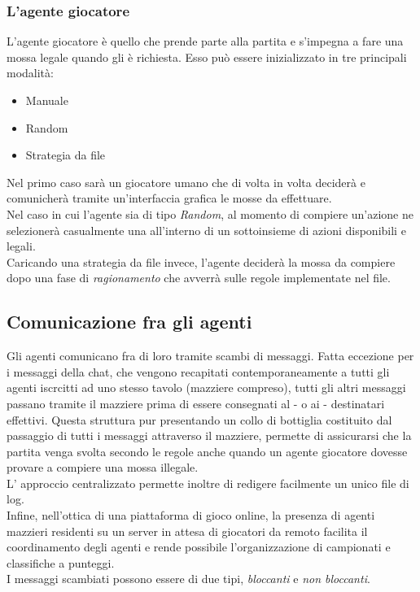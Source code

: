 \documentclass[runningheads,a4paper]{llncs}
\begin{document}
\subsubsection{L'agente giocatore}
L'agente giocatore è quello che prende parte alla partita e s'impegna a fare una mossa legale quando gli è richiesta.
Esso può essere inizializzato in tre principali modalità:
\begin{itemize}
   \item Manuale
   \item Random
   \item Strategia da file 
\end{itemize}
Nel primo caso sarà un giocatore umano che di volta in volta deciderà e comunicherà tramite un'interfaccia grafica le mosse da effettuare.\\
Nel caso in cui l'agente sia di tipo \emph{Random}, al momento di compiere un'azione ne selezionerà casualmente una all'interno di un sottoinsieme di azioni disponibili e legali.\\
Caricando una strategia da file invece, l'agente deciderà la mossa da compiere dopo una fase di \emph{ragionamento} che avverrà sulle regole implementate nel file.\\

\subsection{Comunicazione fra gli agenti}

Gli agenti comunicano fra di loro tramite scambi di messaggi.
Fatta eccezione per i messaggi della chat, che vengono recapitati contemporaneamente a tutti gli agenti iscrcitti ad uno stesso tavolo (mazziere compreso), tutti gli altri messaggi passano tramite il mazziere prima di essere consegnati al - o ai - destinatari effettivi.
Questa struttura pur presentando un collo di bottiglia costituito dal passaggio di tutti i messaggi attraverso il mazziere, permette di assicurarsi che la partita venga svolta secondo le regole anche quando un agente giocatore dovesse provare a compiere una mossa illegale.\\
L' approccio centralizzato permette inoltre di redigere facilmente un unico file di log.\\
Infine, nell'ottica di una piattaforma di gioco online, la presenza di agenti mazzieri residenti su un server in attesa di giocatori da remoto facilita il coordinamento degli agenti e rende possibile l'organizzazione di campionati e classifiche a punteggi.\\
I messaggi scambiati possono essere di due tipi, \emph{bloccanti} e \emph{non bloccanti}.\\
\end{document}
